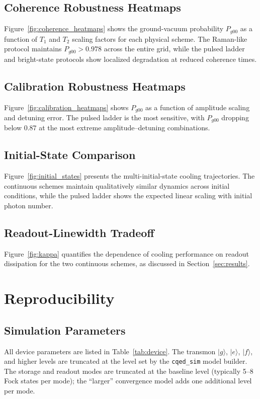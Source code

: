 \documentclass[aps,pra,twocolumn,reprint,floatfix,amsmath,amssymb]{revtex4-2}
\begin{document}
\subsection{Coherence Robustness Heatmaps}

Figure~\ref{fig:coherence_heatmaps} shows the ground-vacuum probability $P_{g00}$ as a function of $T_1$ and $T_2$ scaling factors for each physical scheme.
The Raman-like protocol maintains $P_{g00} > 0.978$ across the entire grid, while the pulsed ladder and bright-state protocols show localized degradation at reduced coherence times.

\subsection{Calibration Robustness Heatmaps}

Figure~\ref{fig:calibration_heatmaps} shows $P_{g00}$ as a function of amplitude scaling and detuning error.
The pulsed ladder is the most sensitive, with $P_{g00}$ dropping below $0.87$ at the most extreme amplitude--detuning combinations.

\subsection{Initial-State Comparison}

Figure~\ref{fig:initial_states} presents the multi-initial-state cooling trajectories.
The continuous schemes maintain qualitatively similar dynamics across initial conditions, while the pulsed ladder shows the expected linear scaling with initial photon number.

\subsection{Readout-Linewidth Tradeoff}

Figure~\ref{fig:kappa} quantifies the dependence of cooling performance on readout dissipation for the two continuous schemes, as discussed in Section~\ref{sec:results}.

\section{Reproducibility}
\label{app:reproducibility}

\subsection{Simulation Parameters}
All device parameters are listed in Table~\ref{tab:device}.
The transmon $|g\rangle$, $|e\rangle$, $|f\rangle$, and higher levels are truncated at the level set by the \texttt{cqed\_sim} model builder.
The storage and readout modes are truncated at the baseline level (typically 5--8 Fock states per mode); the ``larger'' convergence model adds one additional level per mode.
\end{document}
